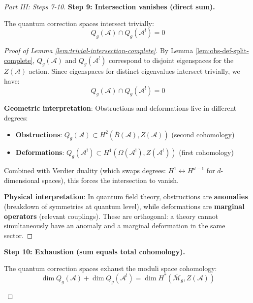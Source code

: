\begin{proof}[Part III: Steps 7-10]
\textbf{Step 9: Intersection vanishes (direct sum).}

\begin{lemma}
\label{lem:trivial-intersection-complete}
The quantum correction spaces intersect trivially:
\begin{equation}
Q_g(\mathcal{A}) \cap Q_g(\mathcal{A}^!) = 0
\end{equation}
\end{lemma}

\begin{proof}[Proof of Lemma \ref{lem:trivial-intersection-complete}]
By Lemma \ref{lem:obs-def-split-complete}, $Q_g(\mathcal{A})$ and $Q_g(\mathcal{A}^!)$ correspond 
to disjoint eigenspaces for the $Z(\mathcal{A})$ action. Since eigenspaces for distinct 
eigenvalues intersect trivially, we have:
\begin{equation}
Q_g(\mathcal{A}) \cap Q_g(\mathcal{A}^!) = 0
\end{equation}

\textbf{Geometric interpretation}: Obstructions and deformations live in different 
degrees:
\begin{itemize}
\item \textbf{Obstructions}: $Q_g(\mathcal{A}) \subset H^2(\bar{B}(\mathcal{A}), Z(
\mathcal{A}))$ (second cohomology)
\item \textbf{Deformations}: $Q_g(\mathcal{A}^!) \subset H^1(\Omega(\mathcal{A}^!), 
Z(\mathcal{A}^!))$ (first cohomology)
\end{itemize}

Combined with Verdier duality (which swaps degrees: $H^1 \leftrightarrow H^{d-1}$ for 
$d$-dimensional spaces), this forces the intersection to vanish.

\textbf{Physical interpretation}: In quantum field theory, obstructions are \textbf{
anomalies} (breakdown of symmetries at quantum level), while deformations are 
\textbf{marginal operators} (relevant couplings). These are orthogonal: a theory 
cannot simultaneously have an anomaly and a marginal deformation in the same sector.
\end{proof}

\textbf{Step 10: Exhaustion (sum equals total cohomology).}

\begin{lemma}
\label{lem:exhaustion-complete}
The quantum correction spaces exhaust the moduli space cohomology:
\begin{equation}
\dim Q_g(\mathcal{A}) + \dim Q_g(\mathcal{A}^!) = \dim H^*(\overline{\mathcal{M}}_g, 
Z(\mathcal{A}))
\end{equation}
\end{lemma}


\end{proof}
